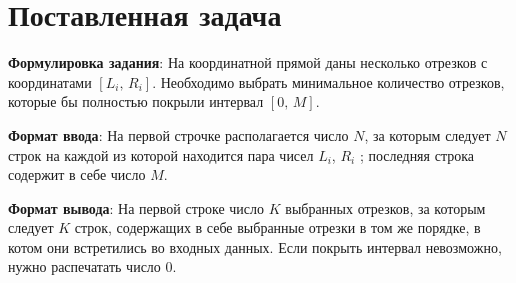 \section{Поставленная задача}

\textbf{Формулировка задания}: На координатной прямой даны несколько отрезков с координатами $[L_i, \, R_i]$. Необходимо выбрать минимальное количество отрезков, которые бы полностью покрыли интервал $[0, \, M]$. 

\par

\textbf{Формат ввода}: На первой строчке располагается число $N$, за которым следует $N$ строк на каждой из которой находится пара чисел $L_i$, $R_i$ ; последняя строка содержит в себе число $M$. 

\par

\textbf{Формат вывода}: На первой строке число $K$ выбранных отрезков, за которым следует $K$ строк, содержащих в себе выбранные отрезки в том же порядке, в котом они встретились во входных данных. Если покрыть интервал невозможно, нужно распечатать число $0$. 

\pagebreak

